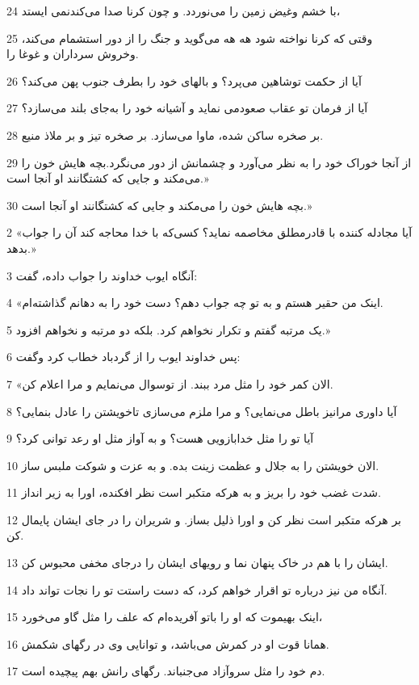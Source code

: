 \par 24 با خشم وغیض زمین را می‌نوردد. و چون کرنا صدا می‌کندنمی ایستد،
\par 25 وقتی که کرنا نواخته شود هه هه می‌گوید و جنگ را از دور استشمام می‌کند، وخروش سرداران و غوغا را.
\par 26 آیا از حکمت توشاهین می‌پرد؟ و بالهای خود را بطرف جنوب پهن می‌کند؟
\par 27 آیا از فرمان تو عقاب صعودمی نماید و آشیانه خود را به‌جای بلند می‌سازد؟
\par 28 بر صخره ساکن شده، ماوا می‌سازد. بر صخره تیز و بر ملاذ منیع.
\par 29 از آنجا خوراک خود را به نظر می‌آورد و چشمانش از دور می‌نگرد.بچه هایش خون را می‌مکند و جایی که کشتگانند او آنجا است.»
\par 30 بچه هایش خون را می‌مکند و جایی که کشتگانند او آنجا است.»
\par 2 «آیا مجادله کننده با قادرمطلق مخاصمه نماید؟ کسی‌که با خدا محاجه کند آن را جواب بدهد.»
\par 3 آنگاه ایوب خداوند را جواب داده، گفت:
\par 4 «اینک من حقیر هستم و به تو چه جواب دهم؟ دست خود را به دهانم گذاشته‌ام.
\par 5 یک مرتبه گفتم و تکرار نخواهم کرد. بلکه دو مرتبه و نخواهم افزود.»
\par 6 پس خداوند ایوب را از گردباد خطاب کرد وگفت:
\par 7 «الان کمر خود را مثل مرد ببند. از توسوال می‌نمایم و مرا اعلام کن.
\par 8 آیا داوری مرانیز باطل می‌نمایی؟ و مرا ملزم می‌سازی تاخویشتن را عادل بنمایی؟
\par 9 آیا تو را مثل خدابازویی هست؟ و به آواز مثل او رعد توانی کرد؟
\par 10 الان خویشتن را به جلال و عظمت زینت بده. و به عزت و شوکت ملبس ساز.
\par 11 شدت غضب خود را بریز و به هرکه متکبر است نظر افکنده، اورا به زیر انداز.
\par 12 بر هرکه متکبر است نظر کن و اورا ذلیل بساز. و شریران را در جای ایشان پایمال کن.
\par 13 ایشان را با هم در خاک پنهان نما و رویهای ایشان را درجای مخفی محبوس کن.
\par 14 آنگاه من نیز درباره تو اقرار خواهم کرد، که دست راستت تو را نجات تواند داد.
\par 15 اینک بهیموت که او را باتو آفریده‌ام که علف را مثل گاو می‌خورد،
\par 16 همانا قوت او در کمرش می‌باشد، و توانایی وی در رگهای شکمش.
\par 17 دم خود را مثل سروآزاد می‌جنباند. رگهای رانش بهم پیچیده است.
